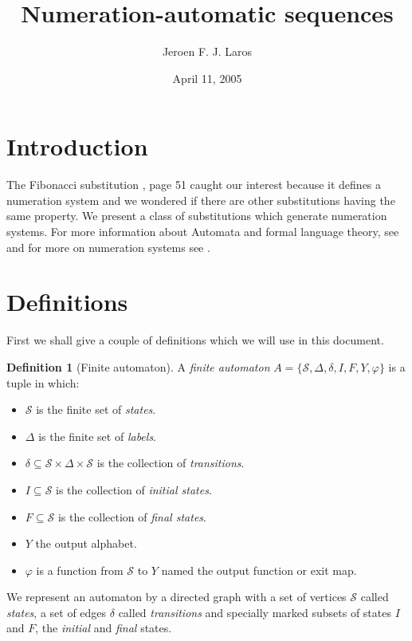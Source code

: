 \documentclass{article}
\title{\Huge{Numeration-automatic sequences}}
\author{Jeroen F. J. Laros}
\date{April 11, 2005}
\theoremstyle{definition}
\newtheorem{definition}[theorem]{Definition}
\begin{document}
\maketitle
\newpage

\tableofcontents
\newpage

\section{Introduction}
The Fibonacci substitution \cite{Fogg}, page 51 caught our interest because it 
defines a numeration system and we wondered if there are other substitutions 
having the same property. We present a class of substitutions which generate 
numeration systems. For more information about Automata and formal language
theory, see \cite{Wood} and for more on numeration systems see \cite{Loth}.

\section{Definitions}
First we shall give a couple of definitions which we will use in this document.

\begin{definition}[Finite automaton] \label{def:automaton}
A \emph{finite automaton} 
$A = \{\mathcal{S}, \Delta, \delta, I, F, Y, \varphi\}$ is a tuple in which:
\begin{itemize}
\item $\mathcal{S}$ is the finite set of \emph{states}.
\item $\Delta$ is the finite set of \emph{labels}.
\item $\delta \subseteq \mathcal{S} \times \Delta \times \mathcal{S}$ is the
      collection of \emph{transitions}.
\item $I \subseteq \mathcal{S}$ is the collection of \emph{initial states}.
\item $F \subseteq \mathcal{S}$ is the collection of \emph{final states}.
\item $Y$ the output alphabet.
\item $\varphi$ is a function from $\mathcal{S}$ to $Y$ named the output
      function or exit map.
\end{itemize}
\end{definition}

We represent an automaton by a directed graph with a set of vertices
$\mathcal{S}$ called \emph{states}, a set of edges $\delta$ called
\emph{transitions} and specially marked subsets of states $I$ and $F$, the
\emph{initial} and \emph{final} states.
\end{document}
